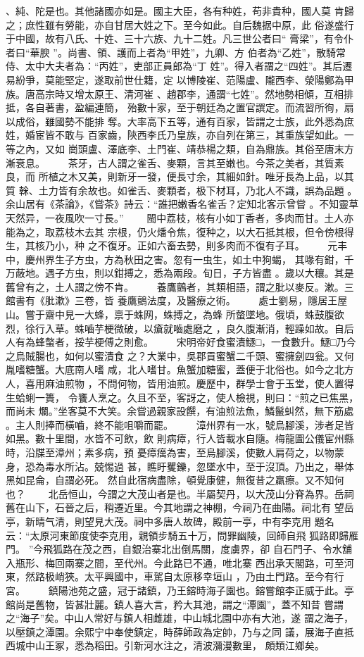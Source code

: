 \documentclass{ctexart}
\begin{document}
、純、陀是也。其他諸國亦如是。國主大臣，各有种姓，苟非貴种，國人莫 肯歸之；庶性雖有勞能，亦自甘居大姓之下。至今如此。自后魏据中原，此 俗遂盛行于中國，故有八氏、十姓、三十六族、九十二姓。凡三世公者曰`` 膏梁''，有令仆者曰``華腴 ''。尚書、領、護而上者為``甲姓''，九卿、方 伯者為``乙姓''，散騎常侍、太中大夫者為：``丙姓''，吏部正員郎為``丁 姓''。得入者謂之``四姓''。其后遷易紛爭，莫能堅定，遂取前世仕籍，定 以博陵崔、范陽盧、隴西李、滎陽鄭為甲族。唐高宗時又增太原王、清河崔 、趙郡李，通謂``七姓''。然地勢相傾，互相排抵，各自著書，盈編連簡， 殆數十家，至于朝廷為之置官譔定。而流習所徇，扇以成俗，雖國勢不能排 奪。大率高下五等，通有百家，皆謂之士族，此外悉為庶姓，婚宦皆不敢与 百家齒，陝西李氏乃皇族，亦自列在第三，其重族望如此。一等之內，又如 崗頭盧、澤底李、土門崔、靖恭楊之類，自為鼎族。其俗至唐末方漸衰息。 　　茶牙，古人謂之雀舌、麥顆，言其至嫩也。今茶之美者，其質素良，而 所植之木又美，則新牙一發，便長寸余，其細如針。唯牙長為上品，以其質 榦、土力皆有余故也。如雀舌、麥顆者，极下材耳，乃北人不識，誤為品題 。余山居有《茶論》，《嘗茶》詩云：``誰把嫩香名雀舌？定知北客示曾嘗 。不知靈草天然异，一夜風吹一寸長。'' 　　閩中荔枝，核有小如丁香者，多肉而甘。土人亦能為之，取荔枝木去其 宗根，仍火燔令焦，復种之，以大石抵其根，但令傍根得生，其核乃小，种 之不復牙。正如六畜去勢，則多肉而不復有子耳。 　　元丰中，慶州界生子方虫，方為秋田之害。忽有一虫生，如土中狗蝎， 其喙有鉗，千万蔽地。遇子方虫，則以鉗搏之，悉為兩段。旬日，子方皆盡 。歲以大穰。其是舊曾有之，土人謂之傍不肯。 　　養鷹鸇者，其類相語，謂之肶以麥反。漱。三館書有《肶漱》三卷，皆 養鷹鸇法度，及醫療之術。 　　處士劉易，隱居王屋山。嘗于齋中見一大蜂，禀于蛛网，蛛搏之，為蜂 所螫墜地。俄頃，蛛鼓腹欲烈，徐行入草。蛛嚙芋梗微破，以瘡就嚙處磨之 ，良久腹漸消，輕躁如故。自后人有為蜂螫者，挼芋梗傅之則愈。 　　宋明帝好食蜜漬鱁□，一食數升。鱁□乃今之烏賊腸也，如何以蜜漬食 之？大業中，吳郡貢蜜蟹二千頭、蜜擁劍四瓮。又何胤嗜糖蟹。大底南人嗜 咸，北人嗜甘。魚蟹加糖蜜，蓋便于北俗也。如今之北方人，喜用麻油煎物 ，不問何物，皆用油煎。慶歷中，群學士會于玉堂，使人置得生蛤蜊一簣， 令饔人烹之。久且不至，客訝之，使人檢視，則曰：``煎之已焦黑，而尚未 爛。''坐客莫不大笑。余嘗過親家設饌，有油煎法魚，鱗鬣虯然，無下筋處 。主人則捧而橫嚙，終不能咀嚼而罷。 　　漳州界有一水，號烏腳溪，涉者足皆如黑。數十里間，水皆不可飲，飲 則病瘴，行人皆載水自隨。梅龍圖公儀宦州縣時，沿牒至漳州；素多病，預 憂瘴癘為害，至烏腳溪，使數人肩荷之，以物蒙身，恐為毒水所沾。兢惕過 甚，瞧盱矍鑠，忽墜水中，至于沒頂。乃出之，舉体黑如昆侖，自謂必死。 然自此宿病盡除，頓覺康健，無復昔之羸瘵。又不知何也？ 　　北岳恒山，今謂之大茂山者是也。半屬契丹，以大茂山分脊為界。岳祠 舊在山下，石晉之后，稍遷近里。今其地謂之神棚，今祠乃在曲陽。祠北有 望岳亭，新晴气清，則望見大茂。祠中多唐人故碑，殿前一亭，中有李克用 題名云：``太原河東節度使李克用，親領步騎五十万，問罪幽陵，回師自飛 狐路即歸雁門。 ''今飛狐路在茂之西，自銀治寨北出倒馬關，度虜界，卻 自石門子、令水舖入瓶形、梅回兩寨之間，至代州。今此路已不通，唯北寨 西出承天閣路，可至河東，然路极峭狹。太平興國中，車駕自太原移幸垣山 ，乃由土門路。至今有行宮。 　　鎮陽池苑之盛，冠于諸鎮，乃王鎔時海子園也。鎔嘗館李正威于此。亭 館尚是舊物，皆甚壯麗。鎮人喜大言，矜大其池，謂之``潭園''，蓋不知昔 嘗謂之``海子''矣。中山人常好与鎮人相雌雄，中山城北園中亦有大池，遂 謂之海子，以壓鎮之潭園。余熙宁中奉使鎮定，時薛師政為定帥，乃与之同 議，展海子直抵西城中山王冢，悉為稻田。引新河水注之，清波瀰漫數里， 頗類江鄉矣。
\clearpage
\end{document}
